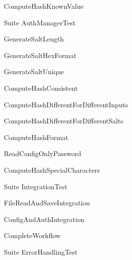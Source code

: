 
\begin{DoxyRefList}
\item[Member \mbox{\hyperlink{test__main_8cpp_a4359f8fbd30dad6a8405241476c861eb}{SUITE}} (Auth\+Manager\+Test)]\label{test__test000027}%
%
Compute\+Hash\+Known\+Value 

\label{test__test000019}%
%
Suite Auth\+Manager\+Test 

\label{test__test000020}%
%
Generate\+Salt\+Length 

\label{test__test000021}%
%
Generate\+Salt\+Hex\+Format 

\label{test__test000022}%
%
Generate\+Salt\+Unique 

\label{test__test000023}%
%
Compute\+Hash\+Consistent 

\label{test__test000024}%
%
Compute\+Hash\+Different\+For\+Different\+Inputs 

\label{test__test000025}%
%
Compute\+Hash\+Different\+For\+Different\+Salts 

\label{test__test000026}%
%
Compute\+Hash\+Format  
\item[Member \mbox{\hyperlink{test__main_8cpp_ad978ef563c93ffa0a173a366ad758a94}{SUITE}} (File\+Handler\+Test)]\label{test__test000018}%
%
Read\+Config\+Only\+Password  
\item[Member \mbox{\hyperlink{test__main_8cpp_a4359f8fbd30dad6a8405241476c861eb}{SUITE}} (Auth\+Manager\+Test)]\label{test__test000028}%
%
Compute\+Hash\+Special\+Characters  
\item[Member \mbox{\hyperlink{test__main_8cpp_a062538dd2e7d0b517c254e158009700c}{SUITE}} (Integration\+Test)]\label{test__test000029}%
%
Suite Integration\+Test 

\label{test__test000030}%
%
File\+Read\+And\+Save\+Integration 

\label{test__test000031}%
%
Config\+And\+Auth\+Integration 

\label{test__test000032}%
%
Complete\+Workflow  
\item[Member \mbox{\hyperlink{test__main_8cpp_afa2e9cc09ee8254e70a9a469df8da470}{SUITE}} (Error\+Handling\+Test)]\label{test__test000033}%
%
Suite Error\+Handling\+Test 


\end{DoxyRefList}
